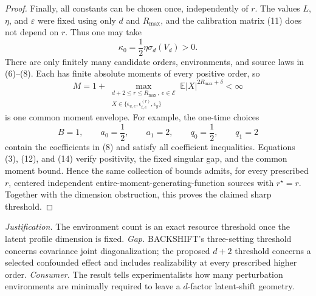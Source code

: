 \documentclass{article}
\begin{document}
\begin{proof}
Finally, all constants can be chosen once, independently of \(r\).  The values \(L\), \(\eta\), and \(\varepsilon\) were fixed using only \(d\) and \(R_{\max}\), and the calibration matrix (11) does not depend on \(r\).  Thus one may take
\[
 \kappa_0=\frac12\eta\sigma_d(V_d)>0.
\]
There are only finitely many candidate orders, environments, and source laws in (6)--(8).  Each has finite absolute moments of every positive order, so
\[
 M
 =1+\max_{\substack{d+2\leq r\leq R_{\max}\,,\ e\in\mathcal E\\
 X\in\{\epsilon_{u,e},\epsilon^{(r)}_{t,e},\epsilon_y\}}}
 \mathbb E|X|^{2R_{\max}+\delta}
 <\infty
 \tag{14}
\]
is one common moment envelope.  For example, the one-time choices
\[
 B=1,
 \qquad a_0=\frac12,
 \qquad a_1=2,
 \qquad q_0=\frac12,
 \qquad q_1=2
\]
contain the coefficients in (8) and satisfy all coefficient inequalities.  Equations (3), (12), and (14) verify positivity, the fixed singular gap, and the common moment bound.  Hence the same collection of bounds admits, for every prescribed \(r\), centered independent entire-moment-generating-function sources with \(r^\star=r\).  Together with the dimension obstruction, this proves the claimed sharp threshold.
\end{proof}
\par\smallskip\noindent \textit{Justification.} The environment count is an exact resource threshold once the latent profile dimension is fixed. \textit{Gap.} BACKSHIFT's three-setting threshold concerns covariance joint diagonalization; the proposed \(d+2\) threshold concerns a selected confounded effect and includes realizability at every prescribed higher order. \textit{Consumer.} The result tells experimentalists how many perturbation environments are minimally required to leave a \(d\)-factor latent-shift geometry.
\end{document}
